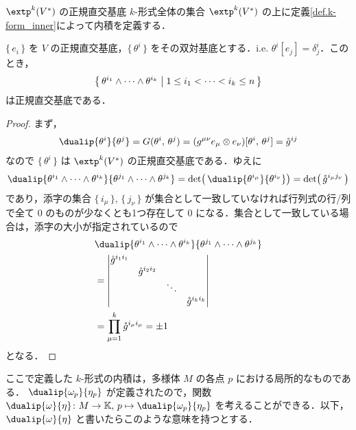 \documentclass[geometry_main]{subfiles}
\begin{document}
\begin{myprop}[label=orthonormal_k-form]{$\extp^k(V^*)$ の正規直交基底}
	$k$-形式全体の集合 $\extp^k(V^*)$ の上に定義\ref{def.k-form_inner}によって内積を定義する．

	$\{\, e_i\, \}$ を $V$ の正規直交基底，$\{\, \theta^i \, \}$ をその双対基底とする．i.e. $\theta^i[e_j] = \delta^i_j$．このとき，
	\begin{align} 
		\bigl\{ \, \theta^{i_1} \wedge \cdots \wedge \theta^{i_k} \bigm| 1 \le i_1 < \cdots < i_k \le n\, \bigr\} 
	\end{align}
	は正規直交基底である．
\end{myprop}
\begin{proof} 
	まず，
	\begin{align} 
		\dualip{\theta^i}{\theta^j} = G(\theta^i,\, \theta^j) = (g^{\mu\nu} e_\mu \otimes e_\nu)[\theta^i,\, \theta^j] = \mathring{g}^{ij}
	\end{align}
	なので $\{\, \theta^i\, \}$ は $\extp^k(V^*)$ の正規直交基底である．ゆえに
	\begin{align} 
		\dualip{\theta^{i_1} \wedge \cdots \wedge \theta^{i_k}}{\theta^{j_1} \wedge \cdots \wedge \theta^{j_k}}
		= \det \bigl( \, \dualip{\theta^{i_\mu}}{\theta^{i_\nu}} \bigr) = \det \bigl( \, \mathring{g}^{i_\mu j_\nu}\, \bigr) 
	\end{align}
	であり，添字の集合 $\{\, i_\mu\, \},\, \{\, j_\nu\, \}$ が集合として一致していなければ行列式の行/列で全て $0$ のものが少なくとも1つ存在して $0$ になる．集合として一致している場合は，添字の大小が指定されているので
	\begin{align} 
		&\dualip{\theta^{i_1} \wedge \cdots \wedge \theta^{i_k}}{\theta^{j_1} \wedge \cdots \wedge \theta^{j_k}} \\
		&= \mqty| \dmat{\mathring{g}^{i_1 i_1}, \mathring{g}^{i_2 i_2}, \ddots, \mathring{g}^{i_k i_k}} | \\
		&= \prod_{\mu = 1}^k \mathring{g}^{i_\mu i_\mu} = \pm 1
	\end{align}
	となる．
\end{proof}

\begin{marker}
	ここで定義した $k$-形式の内積は，多様体 $M$ の各点 $p$ における局所的なものである．
	$\dualip{\omega_p}{\eta_p}$ が定義されたので，関数 $\dualip{\omega}{\eta} \colon M \to \mathbb{K},\, p \mapsto \dualip{\omega_p}{\eta_p}$ を考えることができる．以下，$\dualip{\omega}{\eta}$ と書いたらこのような意味を持つとする．
\end{marker}
\end{document}
